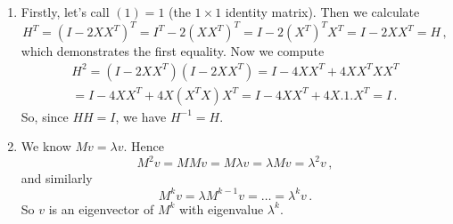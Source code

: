 \begin{enumerate}
\begin{enumerate}
\item Multiplying $M$ by $\lambda$ replaces every matrix element $M^i_{\sigma(j)}$ in the formula for the permanent
by $\lambda M^i_{\sigma(j)}$, and therefore produces an overall factor $\lambda^n$.
\item Multiplying the $i^{\text{th}}$ row by $\lambda$ replaces $M^i_{\sigma(j)}$ in the formula for the permanent
by $\lambda M^i_{\sigma(j)}$. Therefore the permanent is multiplied by an overall factor $\lambda$.
\item The permanent of a matrix transposed equals the permanent of the original matrix, because
in the formula for the permanent this amounts to summing over permutations of rows rather than columns. But we could
then sort the product $M^{\sigma(1)}_1 M^{\sigma(2)}_2\ldots M^{\sigma(n)}_n$ back into its original order using the inverse permutation
 $\sigma^{-1}$. But summing over permutations is equivalent to summing over inverse permutations, and therefore the permanent is unchanged.
\item Swapping two rows also leaves the permanent unchanged. The argument is almost the same as in the previous part, except 
that we need only reshuffle two matrix elements $M^j_{\sigma(i)}$ and $M^i_{\sigma(j)}$ (in the case where rows $i$ and $j$ were swapped).
Then we use the fact that summing over all permutations $\sigma$ or over all permutations $\widetilde \sigma$ obtained
by swapping a pair in $\sigma$ are equivalent operations.
\end{enumerate}

\item Firstly, let's call $(1)=1$ (the $1\times 1$ identity matrix). Then we calculate
\[
H^T=(I-2 X X^T)^T = I^T -2 (X X^T)^T = I -2 (X^T)^T X^T = I - 2 X X^T = H\, ,
\]
which demonstrates the first equality. Now we compute
\begin{gather*}
H^2 = (I-2 X X^T) (I - 2 X X^T) = I - 4 X X^T + 4 X X^T X X^T \\= I - 4 X X^T + 4 X (X^T X) X^T = I - 4 X X^T + 4 X.  1  .X^T = I\, .
\end{gather*}
So, since $HH=I$, we have $H^{-1}=H$.

\item We know $Mv=\lambda v$. Hence 
\[
M^2 v = M M v = M \lambda v = \lambda M v = \lambda^2 v\, , 
\]
and similarly
\[
M^k v = \lambda M^{k-1} v = \ldots = \lambda^k v \, .
\]
So $v$ is an eigenvector of $M^k$ with eigenvalue $\lambda^k$.


\end{enumerate}
